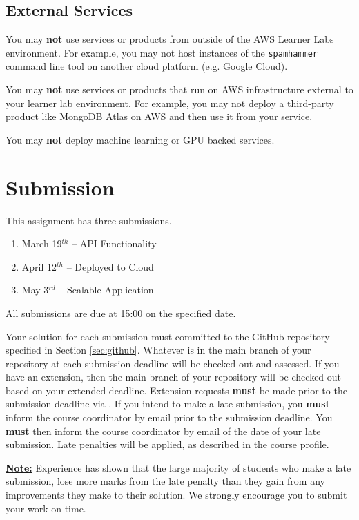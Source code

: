 \documentclass{csse4400}
\begin{document}
\subsection{External Services}
You may \textbf{not} use services or products from outside of the AWS Learner Labs environment.
For example, you may not host instances of the \texttt{spamhammer} command line tool on another cloud platform
(e.g. Google Cloud).

You may \textbf{not} use services or products that run on AWS infrastructure external to your learner lab environment.
For example, you may not deploy a third-party product like MongoDB Atlas on AWS and then use it from your service.

You may \textbf{not} deploy machine learning or GPU backed services.

\section{Submission}
This assignment has three submissions.

\begin{enumerate}
  \item March 19$^{th}$ -- API Functionality
  \item April 12$^{th}$ -- Deployed to Cloud
  \item May 3$^{rd}$ -- Scalable Application
\end{enumerate}
All submissions are due at 15:00 on the specified date.

Your solution for each submission must committed to the GitHub repository specified in Section \ref{sec:github}.
Whatever is in the main branch of your repository at each submission deadline will be checked out and assessed.
If you have an extension, then the main branch of your repository will be checked out based on your extended deadline.
Extension requests \textbf{must} be made prior to the submission deadline via .
If you intend to make a late submission, you \textbf{must} inform the course coordinator by email prior to the submission deadline.
You \textbf{must} then inform the course coordinator by email of the date of your late submission.
Late penalties will be applied, as described in the course profile.

\textbf{\underline{Note:}} Experience has shown that the large majority of students who make a late submission,
lose more marks from the late penalty than they gain from any improvements they make to their solution.
We strongly encourage you to submit your work on-time.
\end{document}
